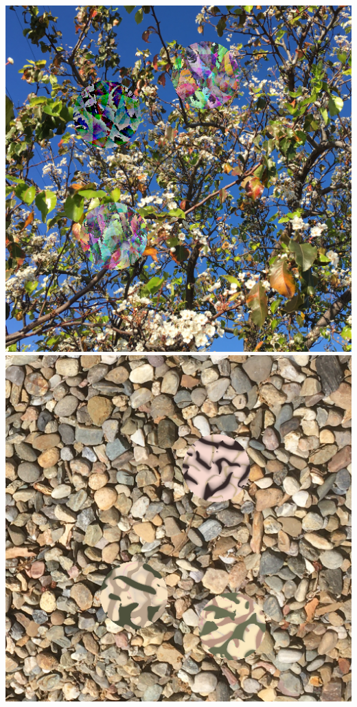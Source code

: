 \documentclass[acmtog]{acmart}
\begin{document}
\begin{teaserfigure}
    \includegraphics[scale=0.24]{20221108_2018_step_6562.png}
    \hfill
    \includegraphics[scale=0.24]{20221215_step_7182.png}

\end{teaserfigure}
\end{document}
